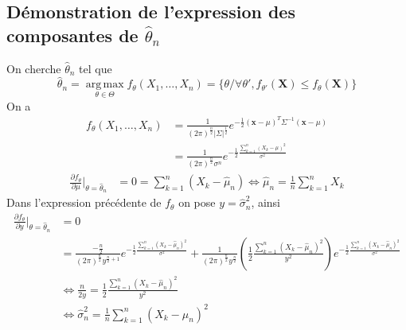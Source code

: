 \documentclass{report}
\begin{document}
		\subsection{Démonstration de l'expression des composantes de $\hat{\theta}_n$}
			On cherche $\hat{\theta}_n$ tel que
			\[ \hat{\theta}_n = \operatorname*{arg\,max}_{\theta \in \Theta} f_\theta(X_1, \ldots, X_n) = \{ \theta / \forall \theta', f_{\theta'}(\textbf{X}) \leq f_{\theta}(\textbf{X}) \} \]
			On a
			\begin{align*}
				f_\theta(X_1, \ldots, X_n) &= \frac{1}{(2\pi)^\frac{n}{2}|\Sigma|^\frac{1}{2}}e^{-\frac{1}{2}(\textbf{x}-\mu)^T\Sigma^{-1}(\textbf{x}-\mu)}\\
				&= \frac{1}{(2\pi)^\frac{n}{2}\sigma^n}e^{-\frac{1}{2}\frac{\sum\limits_{k=1}^n (X_k - \mu)^2}{\sigma^2}}
			\end{align*}
			\begin{align*}
				\frac{\partial f_\theta}{\partial\mu}|_{\theta = \hat{\theta}_n} &= 0 = \sum\limits_{k=1}^n (X_k - \hat{\mu}_n) \Leftrightarrow \hat{\mu}_n = \frac{1}{n}\sum\limits_{k=1}^n X_k
			\end{align*}
			Dans l'expression précédente de $f_\theta$ on pose $y = \hat{\sigma}^2_n$, ainsi
			\begin{align*}
				\frac{\partial f_\theta}{\partial y}|_{\theta = \hat{\theta}_n} &= 0 \\
				&= \frac{-\frac{n}{2}}{(2\pi)^{\frac{n}{2}}y^{\frac{n}{2}+1}}e^{-\frac{1}{2}\frac{\sum\limits_{k=1}^n (X_k - \hat{\mu}_n)^2}{\sigma^2}} + \frac{1}{(2\pi)^{\frac{n}{2}}y^{\frac{n}{2}}}\left( \frac{1}{2}\frac{\sum\limits_{k=1}^n (X_k - \hat{\mu}_n)^2}{y^2} \right)e^{-\frac{1}{2}\frac{\sum\limits_{k=1}^n (X_k - \hat{\mu}_n)^2}{\sigma^2}}\\
				&\Leftrightarrow \frac{n}{2y} = \frac{1}{2}\frac{\sum\limits_{k=1}^n (X_k - \hat{\mu}_n)^2}{y^2} \\
				&\Leftrightarrow \hat{\sigma}^2_n = \frac{1}{n} \sum\limits_{k=1}^n (X_k - \hat{\mu}_n)^2
			\end{align*}
\end{document}
